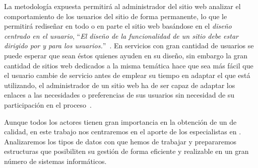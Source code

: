 La metodología expuesta permitirá al administrador del sitio web analizar el comportamiento de los usuarios del sitio de forma permanente, lo que le permitirá rediseñar en todo o en parte el sitio web basándose en el \emph{diseño centrado en el usuario}, "`\emph{El diseño de la funcionalidad de un sitio debe estar dirigido por y para los usuarios.}"'~\citep{BaezaYatesRivera_UbicuidadYUsabilidadEnLaWeb_2003}. En servicios con gran cantidad de usuarios se puede esperar que sean éstos quienes ayuden en su diseño, sin embargo la gran cantidad de sitios web dedicados a la misma temática hace que sea más fácil que el usuario cambie de servicio antes de emplear su tiempo en adaptar el que está utilizando, el administrador de un sitio web ha de ser capaz de adaptar los enlaces a las necesidades o preferencias de sus usuarios sin necesidad de su participación en el proceso~\citep{FinkKobsaNill_UserOrientedAdaptivity_1996,JoachimsFreitagMitchell_WebWatcherATourGuideForTheWorldWideWeb_1997,FerreJuristoWindlConstantine_UsabilityBasicsForSoftwareDevelopment_2001}.

Aunque todos los actores tienen gran importancia en la obtención de un \SRW de calidad, en este trabajo nos centraremos en el aporte de los especialistas en \dm. Analizaremos los tipos de datos con que hemos de trabajar y prepararemos estructuras que posibiliten su gestión de forma eficiente y realizable en un gran número de sistemas informáticos.%